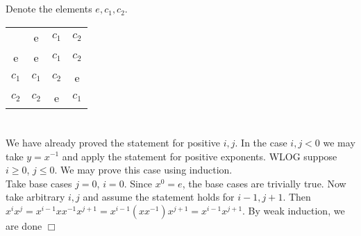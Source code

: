 \documentclass{article}
\begin{document}
\section{}
Denote the elements $e, c_1, c_2$.
\begin{center}\begin{tabular}{ c c c c }
     & e & $c_1$ & $c_2$\\
    \cline{2-4}
    e & \multicolumn{1}{|c}{e} & \multicolumn{1}{|c|}{$c_1$} & \multicolumn{1}{c|}{$c_2$}\\
    \cline{2-4}
    $c_1$ & \multicolumn{1}{|c}{$c_1$} & \multicolumn{1}{|c|}{$c_2$} & \multicolumn{1}{c|}{e}\\
    \cline{2-4}
    $c_2$ & \multicolumn{1}{|c}{$c_2$} & \multicolumn{1}{|c|}{e} & \multicolumn{1}{c|}{$c_1$}\\
    \cline{2-4}
\end{tabular}\end{center}

\section{}
We have already proved the statement for positive $i,j$. In the case $i,j < 0$ we may take $y = x^{-1}$ and apply the statement for positive exponents. WLOG suppose $i \geq 0$, $j \leq 0$. We may prove this case using induction.\\
Take base cases $j = 0$, $i = 0$. Since $x^0 = e$, the base cases are trivially true. Now take arbitrary $i,j$ and assume the statement holds for $i-1, j+1$. Then $x^ix^j = x^{i-1}xx^{-1}x^{j+1} = x^{i-1}(xx^{-1})x^{j+1} = x^{i-1}x^{j+1}$. By weak induction, we are done $\Box$
\end{document}
